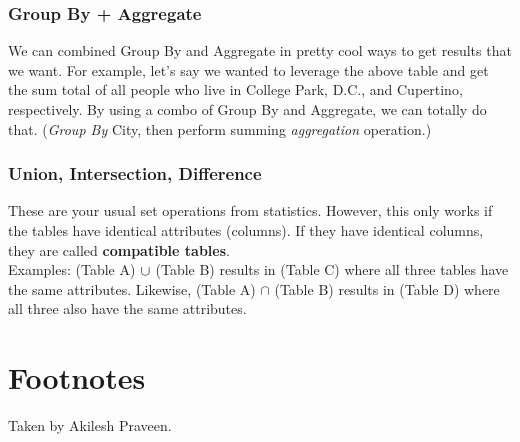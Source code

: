 \documentclass[english, 10pt]{article}
\begin{document}
\subsubsection{Group By + Aggregate}

We can combined Group By and Aggregate in pretty cool ways to get results that we want. For example, let's say we wanted to leverage the above table and get the sum total of all people who live in College Park, D.C., and Cupertino, respectively. By using a combo of Group By and Aggregate, we can totally do that. (\textit{Group By} City, then perform summing \textit{aggregation} operation.)

\subsubsection{Union, Intersection, Difference}

These are your usual set operations from statistics. However, this only works if the tables have identical attributes (columns). If they have identical columns, they are called \textbf{compatible tables}.\\

Examples: (Table A) $\cup$ (Table B) results in (Table C) where all three tables have the same attributes. Likewise, (Table A) $\cap$ (Table B) results in (Table D) where all three also have the same attributes.

\section{Footnotes}

Taken by Akilesh Praveen.
\end{document}
